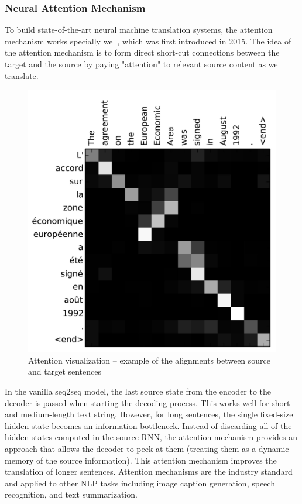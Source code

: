 \documentclass[a4paper,12pt]{report}
\begin{document}
\subsubsection {Neural Attention Mechanism\cite{nmt}}
To build state-of-the-art neural machine translation systems, the attention mechanism works specially well, which was first introduced in 2015. The idea of the attention mechanism is to form direct short-cut connections between the target and the source by paying "attention" to relevant source content as we translate\cite{nmt}.
\begin{figure}[H]
\begin{center}
\includegraphics[scale=.1]{attention_vis}
\caption{Attention visualization – example of the alignments between source and target sentences}
\end{center}
\end{figure}
\noindent In the vanilla seq2seq model, the last source state from the encoder to the decoder is passed when starting the decoding process. This works well for short and medium-length text string. However, for long sentences, the single fixed-size hidden state becomes an information bottleneck. Instead of discarding all of the hidden states computed in the source RNN, the attention mechanism provides an approach that allows the decoder to peek at them (treating them as a dynamic memory of the source information). This attention mechanism improves the translation of longer sentences. Attention mechanisms are the industry standard and applied to  other NLP tasks including image caption generation, speech recognition, and text summarization.
\end{document}
